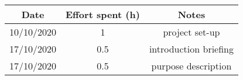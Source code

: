 \documentclass[../../main.tex]{subfiles}
\begin{document}
    \begin{center}
        \begin{tabular}{|c| |c| |c|} 
            \hline
            Date & Effort spent (h) & Notes\\ [0.5ex] 
            \hline\hline
            10/10/2020 & 1 & project set-up\\ 
            17/10/2020 & 0.5 & introduction briefing\\ 
            17/10/2020 & 0.5 & purpose description\\ 
            \hline
        \end{tabular}
    \end{center}
\end{document}
